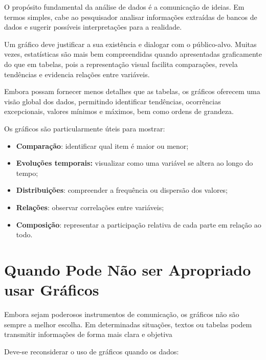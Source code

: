 O propósito fundamental da análise de dados é a comunicação de ideias. Em termos simples, cabe ao pesquisador analisar informações extraídas de bancos de dados e sugerir possíveis interpretações para a realidade.\vskip0.3cm


Um gráfico deve justificar a sua existência e dialogar com o público-alvo. Muitas vezes, estatísticas são mais bem compreendidas quando apresentadas graficamente do que em tabelas, pois a representação visual facilita comparações, revela tendências e evidencia relações entre variáveis.\vskip0.3cm


Embora possam fornecer menos detalhes que as tabelas, os gráficos oferecem uma visão global dos dados, permitindo identificar tendências, ocorrências excepcionais, valores mínimos e máximos, bem como ordens de grandeza.\vskip0.3cm


Os gráficos são particularmente úteis para mostrar:


\begin{itemize}
    \item \textbf{Comparação}: identificar qual item é maior ou menor;
    \item \textbf{Evoluções temporais:} visualizar como uma variável se altera ao longo do tempo;
    \item \textbf{Distribuições}: compreender a frequência ou dispersão dos valores;
    \item \textbf{Relações}: observar correlações entre variáveis;
    \item \textbf{Composição}: representar a participação relativa de cada parte em relação ao todo.
\end{itemize}


\section{Quando Pode Não ser Apropriado usar Gráficos}


Embora sejam poderosos instrumentos de comunicação, os gráficos não são sempre a melhor escolha. Em determinadas situações, textos ou tabelas podem transmitir informações de forma mais clara e objetiva \vskip0.3cm

Deve-se reconsiderar o uso de gráficos quando os dados:

